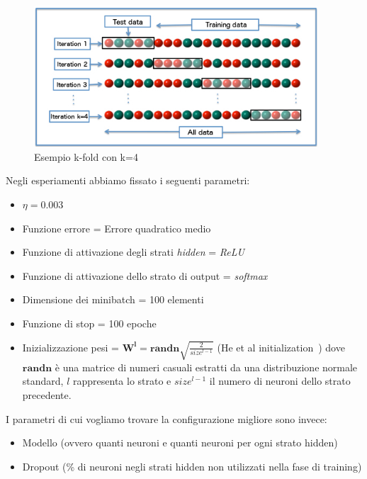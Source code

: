 \documentclass[11pt,a4paper,twoside,
openright]{book}
\newcommand{\matr}[1]{\mathbf{#1}}
\begin{document}
\begin{figure}[h!]
\begin{center}
\includegraphics[width=300pt]{K-fold_cross_validation_EN.jpg}
\caption{Esempio k-fold con k=4~\cite{pict_kfold}}
\end{center}
\label{fig:kfold}
\end{figure}

Negli esperiamenti abbiamo fissato i seguenti parametri:
\begin{itemize}
\item $\eta=0.003$
\item Funzione errore = Errore quadratico medio
\item Funzione di attivazione degli strati \textit{hidden} = \textit{ReLU}
\item Funzione di attivazione dello strato di output = \textit{softmax}
\item Dimensione dei minibatch = 100 elementi
\item Funzione di stop = 100 epoche
\item Inizializzazione pesi = $\matr{W^l}= \matr{randn}\sqrt{\frac{2}{size^{l-1}}}$  (He et al initialization~\cite{he2015delving}) dove $\matr{randn}$ è una matrice di numeri casuali estratti da una distribuzione normale standard, $l$ rappresenta lo strato e $size^{l-1}$ il numero di neuroni dello strato precedente.
\end{itemize}

I parametri di cui vogliamo trovare la configurazione migliore sono invece:
\begin{itemize}
\item Modello (ovvero quanti neuroni e quanti neuroni per ogni strato hidden)
\item Dropout (\% di neuroni negli strati hidden non utilizzati nella fase di training)
\end{itemize}
\end{document}
